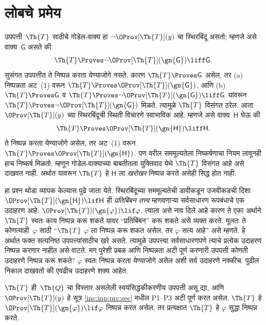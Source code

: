\section{लोबचे प्रमेय}\label{inc:inp:lob:sec}

उपपत्ती~$\Th{T}$ साठीचे गोडेल-वाक्य
हा $\lnot \OProv[\Th{T}](y)$ चा
स्थिरबिंदू असतो; म्हणजे असे
वाक्य~$\mathsf{G}$ असते की
\[\Th{T} \Proves \lnot \OProv[\Th{T}](\gn{\mathsf{G}}) \liff \mathsf{G}.
\]
सुसंगत उपपत्तीत ते निष्पन्न करता येण्याजोगे नसते. कारण
$\Th{T} \Proves \mathsf{G}$ असेल, तर
(a) निष्पन्नता अट~(1) वरून
$\Th{T} \Proves \OProv[\Th{T}](\gn{\mathsf{G}})$,
आणि (b) $\Th{T}
\Proves \mathsf{G}$ व $\Th{T} \Proves \lnot \OProv[\Th{T}](\gn{\mathsf{G}})
\liff \mathsf{G}$ यांवरून
$\Th{T} \Proves \lnot \OProv[\Th{T}](\gn{\mathsf{G}})$
मिळते. त्यामुळे $\Th{T}$ विसंगत
ठरेल. आता $\OProv[\Th{T}](y)$
च्या स्थिरबिंदूची स्थिती विचारणे
स्वाभाविक आहे. म्हणजे असे
वाक्य~$\mathsf{H}$ घेऊ की
\[\Th{T} \Proves \OProv[\Th{T}](\gn{\mathsf{H}}) \liff \mathsf{H}.
\]
ते निष्पन्न करता येण्याजोगे असेल, तर
अट~(1) वरून
$\Th{T} \Proves \OProv[\Th{T}](\gn{\mathsf{H}})$.
पण वरील सममूल्यतेला
निष्कर्षणाचा नियम लावूनही
हाच निष्कर्ष मिळतो.
म्हणून गोडेल-वाक्याच्या
बाबतीतला युक्तिवाद येथे
$\Th{T}$ विसंगत आहे
असे दाखवत नाही.
अर्थात यावरून
$\Th{T}$ हे
$\mathsf{H}$ ला \emph{खरोखर}
निष्पन्न करते असेही
सिद्ध होत नाही.

हा प्रश्न थोडा व्यापक
केल्यास पुढे जाता येते.
स्थिरबिंदूच्या
सममूल्यतेची
डावीकडून उजवीकडची
दिशा
$\OProv[\Th{T}](\gn{\mathsf{H}}) \lif \mathsf{H}$
ही \emph{प्रतिबिंबन तत्त्व}
म्हणवणाऱ्या सर्वसाधारण
रूपबंधाचे एक उदाहरण आहे:
$\OProv[\Th{T}](\gn{\varphi}) \lif \varphi$.
त्याला असे नाव दिले
आहे कारण ते एका
अर्थाने $\Th{T}$
स्वतः काय निष्पन्न
करू शकते यावर
“प्रतिबिंबन” करू शकते
असे व्यक्त करते.
मूलतः ते कोणत्याही~$\varphi$
साठी “$\Th{T}$
$\varphi$ ला निष्पन्न
करू शकत असेल, तर
$\varphi$ सत्य आहे”
असे म्हणते. हे
अर्थात फक्त सत्यनिष्ठ
उपपत्त्यांसाठीच खरे
असते. त्यामुळे
उपपत्त्या सर्वसाधारणपणे
त्याचे प्रत्येक उदाहरण
निष्पन्न करणार नाहीत
असे वाटते. मग
पुरेशी प्रबळ आणि
निष्पन्नता अटी
पूर्ण करणारी उपपत्ती
कोणती उदाहरणे
निष्पन्न करू शकते?
$\varphi$ स्वतः
निष्पन्न करता येण्याजोगे असेल
अशी सर्व उदाहरणे
नक्कीच. पुढील
निकाल दाखवतो की
एवढीच उदाहरणे शक्य
आहेत.

\begin{thm}\label{inc:inp:lob:thm:lob}
$\Th{T}$ ही~$\Th{Q}$
चा विस्तार असलेली
स्वयंसिद्धकीकरणीय
उपपत्ती असू द्या,
आणि $\OProv[\Th{T}](y)$
हे सूत्र \ref{inc:inp:prc:sec}
मधील P1--P3 अटी
पूर्ण करत असेल.
$\Th{T}$ हे
$\OProv[\Th{T}](\gn{\varphi}) \lif \varphi$
निष्पन्न करत
असेल, तर प्रत्यक्षात
$\Th{T}$ हे
$\varphi$ सुद्धा
निष्पन्न करते.
\end{thm}

